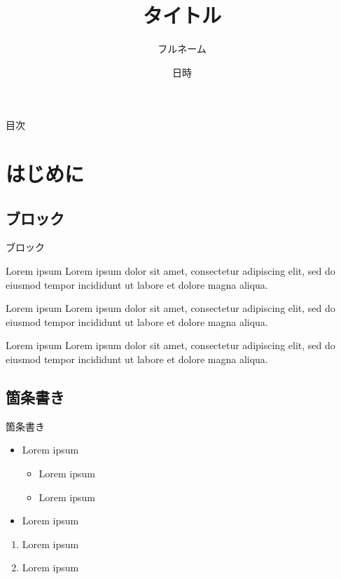 \documentclass[12pt,unicode]{beamer}
\title{タイトル}
\author[名字とか]{フルネーム}
\date{日時}
\begin{document}
  {\maketitle}


  \begin{frame}{目次}
    \tableofcontents
  \end{frame}

  \section{はじめに}
  \subsection{ブロック}
  \begin{frame}{ブロック}
    \begin{block}{Lorem ipsum}
      Lorem ipsum dolor sit amet, consectetur adipiscing elit, sed do eiusmod tempor incididunt ut labore et dolore magna aliqua.
    \end{block}

    \begin{alertblock}{Lorem ipsum}
      Lorem ipsum dolor sit amet, consectetur adipiscing elit, sed do eiusmod tempor incididunt ut labore et dolore magna aliqua.
    \end{alertblock}

    \begin{exampleblock}{Lorem ipsum}
      Lorem ipsum dolor sit amet, consectetur adipiscing elit, sed do eiusmod tempor incididunt ut labore et dolore magna aliqua.
    \end{exampleblock}
  \end{frame}

  \subsection{箇条書き}
  \begin{frame}{箇条書き}
    \begin{itemize}
      \item Lorem ipsum
      \begin{itemize}
        \item Lorem ipsum
        \item Lorem ipsum
      \end{itemize}
      \item Lorem ipsum
    \end{itemize}

    \begin{enumerate}
      \item Lorem ipsum
      \item Lorem ipsum
    \end{enumerate}
  \end{frame}
\end{document}
